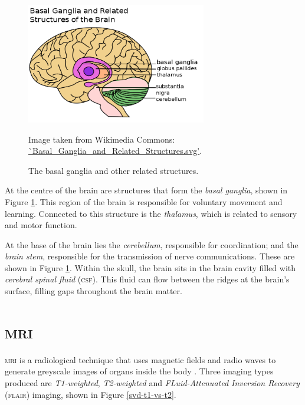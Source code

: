 \begin{figure}[ht]
	\centering
	\includegraphics[width=0.7\textwidth]{Images/2_Basal_Ganglia_and_Related_Structures.png}
	\caption{The basal ganglia and other related structures.}
	\small Image taken from Wikimedia Commons: \url{`Basal_Ganglia_and_Related_Structures.svg'}.
	\label{svd-basalfig}
\end{figure}

At the centre of the brain are structures that form the \textit{basal ganglia}, shown in Figure \ref{svd-basalfig}. This region of the brain is responsible for voluntary movement and learning. Connected to this structure is the \textit{thalamus}, which is related to sensory and motor function.

At the base of the brain lies the \textit{cerebellum}, responsible for coordination; and the \textit{brain stem}, responsible for the transmission of nerve communications. These are shown in Figure \ref{svd-basalfig}. Within the skull, the brain sits in the brain cavity filled with \textit{cerebral spinal fluid} (\textsc{csf}). This fluid can flow between the ridges at the brain's surface, filling gaps throughout the brain matter.


\section{\textsc{mri}}\label{svd-MRI}

\textsc{mri} is a radiological technique that uses magnetic fields and radio waves to generate greyscale images of organs inside the body \cite{Rinck2013}. Three imaging types produced are \textit{T1-weighted}, \textit{T2-weighted} and \textit{FLuid-Attenuated Inversion Recovery} (\textsc{flair}) imaging, shown in Figure \ref{svd-t1-vs-t2}.

